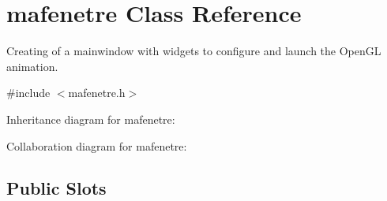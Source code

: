 \hypertarget{classmafenetre}{\section{mafenetre Class Reference}
\label{classmafenetre}
}


Creating of a mainwindow with widgets to configure and launch the Open\+G\+L animation.  




{\ttfamily \#include $<$mafenetre.\+h$>$}



Inheritance diagram for mafenetre\+:


Collaboration diagram for mafenetre\+:
\subsection*{Public Slots}
